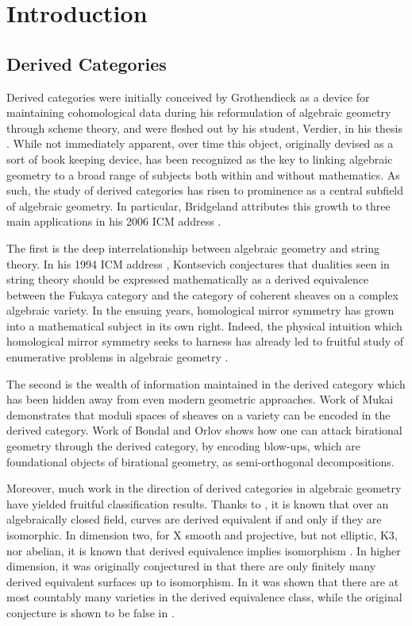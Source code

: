 \chapter*{Introduction}
\section*{Derived Categories}
Derived categories were initially conceived by Grothendieck as a device for maintaining cohomological data during his reformulation of algebraic geometry through scheme theory, and were fleshed out by his student, Verdier, in his thesis \parencite{Verdier}.
While not immediately apparent, over time this object, originally devised as a sort of book keeping device, has been recognized as the key to linking algebraic geometry to a broad range of subjects both within and without mathematics.
As such, the study of derived categories has risen to prominence as a central subfield of algebraic geometry.
In particular, Bridgeland attributes this growth to three main applications in his 2006 ICM address \parencite{Bridgeland06}.

The first is the deep interrelationship between algebraic geometry and string theory.
In his 1994 ICM address \parencite{Kontsevich95}, Kontsevich conjectures that dualities seen in string theory should be expressed mathematically as a derived equivalence between the Fukaya category and the category of coherent sheaves on a complex algebraic variety.
In the ensuing years, homological mirror symmetry has grown into a mathematical subject in its own right.
Indeed, the physical intuition which homological mirror symmetry seeks to harness has already led to fruitful study of enumerative problems in algebraic geometry \parencite{enumerative}.

The second is the wealth of information maintained in the derived category which has been hidden away from even modern geometric approaches.
Work of Mukai \parencite{Mukai81,Mukai87} demonstrates that moduli spaces of sheaves on a variety can be encoded in the derived category.
Work of Bondal and Orlov \parencite{Bondal-Orlov} shows how one can attack birational geometry through the derived category, by encoding blow-ups, which are foundational objects of birational geometry, as semi-orthogonal decompositions.

Moreover, much work in the direction of derived categories in algebraic geometry have yielded fruitful classification results.
Thanks to \parencite{Orlov97}, it is known that over an algebraically closed field, curves are derived equivalent if and only if they are isomorphic.
In dimension two, for X smooth and projective, but not elliptic, K3, nor abelian, it is known that derived equivalence implies isomorphism \parencite[Prop. 12.1]{HuybrechtsFMT}.
In higher dimension, it was originally conjectured in \parencite{Kawamata02} that there are only finitely many derived equivalent surfaces up to isomorphism.
In \parencite{Anel-Toen09} it was shown that there are at most countably many varieties in the derived equivalence class, while the original conjecture is shown to be false in \parencite{Lesieutre15}.


